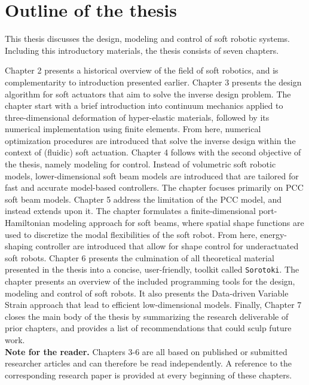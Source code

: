 \section{Outline of the thesis}
\label{sec:intro:outline}
This thesis discusses the design, modeling and control of soft robotic systems. Including this introductory materials, the thesis consists of seven chapters. 

Chapter 2 presents a historical overview of the field of soft robotics, and is complementarity to introduction presented earlier. Chapter 3 presents the design algorithm for soft actuators that aim to solve the inverse design problem. The chapter start with a brief introduction into continuum mechanics applied to three-dimensional deformation of hyper-elastic materials, followed by its numerical implementation using finite elements. From here, numerical optimization procedures are introduced that solve the inverse design within the context of (fluidic) soft actuation. Chapter 4 follows with the second objective of the thesis, namely modeling for control. Instead of volumetric soft robotic models, lower-dimensional soft beam models are introduced that are tailored for fast and accurate model-based controllers. The chapter focuses primarily on PCC soft beam models. Chapter 5 address the limitation of the PCC model, and instead extends upon it. The chapter formulates a finite-dimensional port-Hamiltonian modeling approach for soft beams, where spatial shape functions are used to discretize the modal flexibilities of the soft robot. From here, energy-shaping controller are introduced that allow for shape control for underactuated soft robots. Chapter 6 presents the culmination of all theoretical material presented in the thesis into a concise, user-friendly, toolkit called \texttt{Sorotoki}. The chapter presents an overview of the included programming tools for the design, modeling and control of soft robots. It also presents the Data-driven Variable Strain approach that lead to efficient low-dimensional models. Finally, Chapter 7 closes the main body of the thesis by summarizing the research deliverable of prior chapters, and provides a list of recommendations that could sculp future work.\\

\textbf{Note for the reader.} Chapters 3-6 are all based on published or submitted researcher articles and can therefore be read independently. A reference to the corresponding research paper is provided at every beginning of these chapters. 

